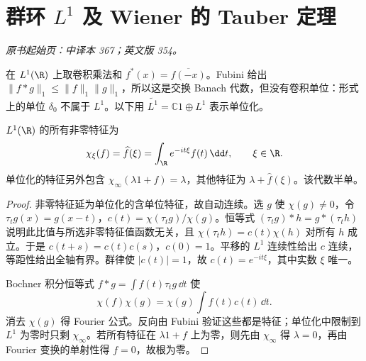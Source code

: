 \section{群环 \texorpdfstring{$L^1$}{L1} 及 Wiener 的 Tauber 定理}\label{sec:yosida-11-16}
\noindent\textit{原书起始页：中译本 367；英文版 354。}

在 $L^1(\R)$ 上取卷积乘法和 $f^*(x)=\overline{f(-x)}$。Fubini 给出 $\|f*g\|_1\le\|f\|_1\|g\|_1$，所以这是交换 Banach 代数，但没有卷积单位：形式上的单位 $\delta_0$ 不属于 $L^1$。以下用 $\widetilde{L^1}=\mathbb C1\oplus L^1$ 表示单位化。

\begin{theorem}[群环的特征与半单性]\label{thm:y11-group-characters}
$L^1(\R)$ 的所有非零特征为
\[
 \chi_\xi(f)=\widehat f(\xi)=\int_\R e^{-it\xi}f(t)\,\dd t,\qquad \xi\in\R.
\]
单位化的特征另外包含 $\chi_\infty(\lambda1+f)=\lambda$，其他特征为 $\lambda+\widehat f(\xi)$。该代数半单。
\end{theorem}
\begin{proof}
非零特征延为单位化的含单位特征，故自动连续。选 $g$ 使 $\chi(g)\ne0$，令 $\tau_tg(x)=g(x-t)$，$c(t)=\chi(\tau_tg)/\chi(g)$。恒等式 $(\tau_tg)*h=g*(\tau_th)$ 说明此比值与所选非零特征值函数无关，且 $\chi(\tau_th)=c(t)\chi(h)$ 对所有 $h$ 成立。于是 $c(t+s)=c(t)c(s)$，$c(0)=1$。平移的 $L^1$ 连续性给出 $c$ 连续，等距性给出全轴有界。群律使 $|c(t)|=1$，故 $c(t)=e^{-it\xi}$，其中实数 $\xi$ 唯一。

Bochner 积分恒等式 $f*g=\int f(t)\tau_tg\,\dd t$ 使
\[
 \chi(f)\chi(g)=\chi(g)\int f(t)c(t)\,\dd t.
\]
消去 $\chi(g)$ 得 Fourier 公式。反向由 Fubini 验证这些都是特征；单位化中限制到 $L^1$ 为零时只剩 $\chi_\infty$。若所有特征在 $\lambda1+f$ 上为零，则先由 $\chi_\infty$ 得 $\lambda=0$，再由 Fourier 变换的单射性得 $f=0$，故根为零。
\end{proof}

